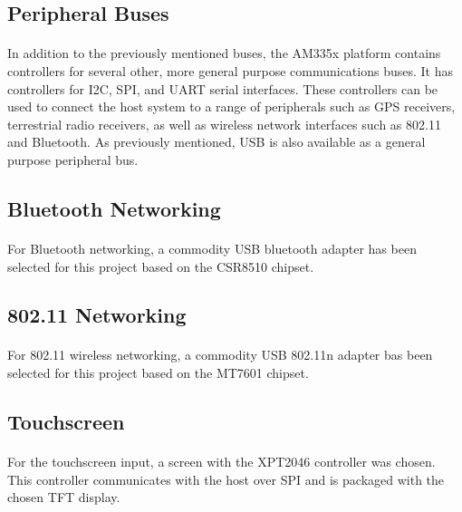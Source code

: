 \subsection{Peripheral Buses}

\paragraph{}
In addition to the previously mentioned buses, the AM335x platform contains controllers for several other, more general purpose communications buses.
It has controllers for I2C, SPI, and UART serial interfaces.
These controllers can be used to connect the host system to a range of peripherals such as GPS receivers, terrestrial radio receivers, as well as wireless network interfaces such as 802.11 and Bluetooth.
As previously mentioned, USB is also available as a general purpose peripheral bus.

\subsection{Bluetooth Networking}

\paragraph{}
For Bluetooth networking, a commodity USB bluetooth adapter has been selected for this project based on the CSR8510 chipset.

\subsection{802.11 Networking}

\paragraph{}
For 802.11 wireless networking, a commodity USB 802.11n adapter bas been selected for this project based on the MT7601 chipset.

\subsection{Touchscreen}

\paragraph{}
For the touchscreen input, a screen with the XPT2046 controller was chosen.
This controller communicates with the host over SPI and is packaged with the chosen TFT display.

